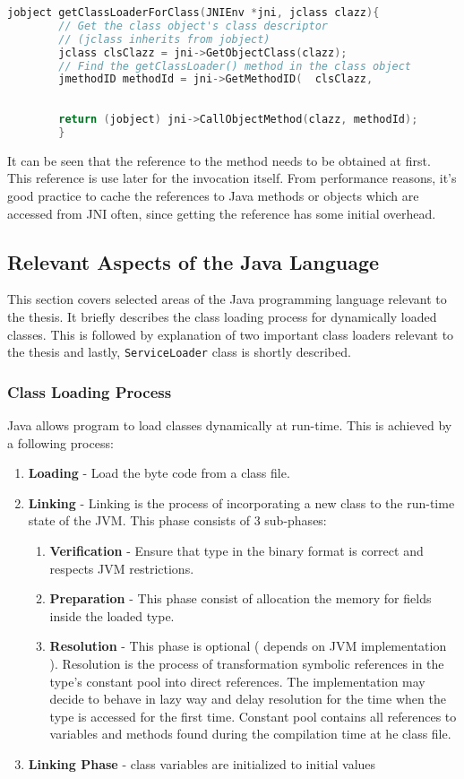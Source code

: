 \begin{lstlisting}[language=c++]
        jobject getClassLoaderForClass(JNIEnv *jni, jclass clazz){
        // Get the class object's class descriptor
        // (jclass inherits from jobject)
        jclass clsClazz = jni->GetObjectClass(clazz);
        // Find the getClassLoader() method in the class object
        jmethodID methodId = jni->GetMethodID(	clsClazz,
																         "getClassLoader",
																         "()Ljava/lang/ClassLoader;");
        return (jobject) jni->CallObjectMethod(clazz, methodId);
        }
\end{lstlisting}

It can be seen that the reference to the method needs to be obtained at first. This reference is use later for the invocation itself. From performance reasons, it's good practice to cache the references to Java methods or objects which are accessed from JNI often, since getting the reference has some initial overhead.

\subsection{Relevant Aspects of the  Java Language}
This section covers selected areas of the Java programming language relevant to the thesis. It briefly describes the class loading process for dynamically loaded classes. This is followed by explanation of two important class loaders relevant to the thesis and lastly, \texttt{ServiceLoader} class is shortly described.
\subsubsection{Class Loading Process}
Java allows program to load classes dynamically at run-time. This is achieved by a following process:
\begin{enumerate}
	\item \textbf{Loading} - Load the byte code from a class file.
	\item \textbf{Linking} - Linking is the process of incorporating a new class to the run-time state of the JVM. This phase consists of 3 sub-phases:
	\begin{enumerate}
		\item \textbf{Verification} - Ensure that type in the binary format is correct and respects JVM restrictions.
		\item \textbf{Preparation} - This phase consist of allocation the memory for fields inside the loaded type.
		\item \textbf{Resolution} - This phase is optional ( depends on JVM implementation ). Resolution is the process of transformation symbolic references in the type's constant pool into direct references. The implementation may decide to behave in lazy way and delay resolution for the time when the type is accessed for the first time. Constant pool contains all references to variables and methods found during the compilation time at he class file.
	\end{enumerate}
	\item \textbf{Linking Phase} - class variables are initialized to initial values
\end{enumerate}
